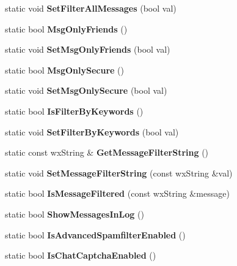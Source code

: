 \begin{DoxyCompactItemize}
\item 
static void {\bfseries SetFilterAllMessages} (bool val)\label{classCPreferences_abb02e3281a7bfe5cb02b1ddbbdaae03b}

\item 
static bool {\bfseries MsgOnlyFriends} ()\label{classCPreferences_a98b66e0b4f401a71e23ad5dfe342da9c}

\item 
static void {\bfseries SetMsgOnlyFriends} (bool val)\label{classCPreferences_aacbac5fea05093c5eb4253580022d9be}

\item 
static bool {\bfseries MsgOnlySecure} ()\label{classCPreferences_aedc99cb7631493ea8e095b54509bccd9}

\item 
static void {\bfseries SetMsgOnlySecure} (bool val)\label{classCPreferences_a6ecb1151b8bbd7761db6589ea587d338}

\item 
static bool {\bfseries IsFilterByKeywords} ()\label{classCPreferences_a06b2cfaca30145e01959383a2023e07c}

\item 
static void {\bfseries SetFilterByKeywords} (bool val)\label{classCPreferences_a6943a3dc0bb6f8e4730a62c717215cb8}

\item 
static const wxString \& {\bfseries GetMessageFilterString} ()\label{classCPreferences_a20524ff21b2c6e448fdb7a5e39c9fd98}

\item 
static void {\bfseries SetMessageFilterString} (const wxString \&val)\label{classCPreferences_a69068a2a8b7a15df9bd4a1cf0a33d049}

\item 
static bool {\bfseries IsMessageFiltered} (const wxString \&message)\label{classCPreferences_a27b7215de2a5387fbaaa5f7655abc3cd}

\item 
static bool {\bfseries ShowMessagesInLog} ()\label{classCPreferences_a4b154c22bdb924e2ea404c2ef2f20796}

\item 
static bool {\bfseries IsAdvancedSpamfilterEnabled} ()\label{classCPreferences_a6afd19a0f3a782e2dab52b4a23ddbfda}

\item 
static bool {\bfseries IsChatCaptchaEnabled} ()\label{classCPreferences_aa023fe2d970848d063c6d74f5c19cbf8}


\end{DoxyCompactItemize}
